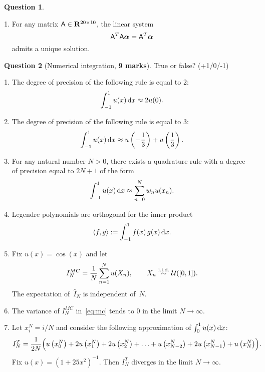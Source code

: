 \documentclass[11pt]{article}
\theoremstyle{definition}
\newtheorem{question}{{\normalfont \faGears}~Question}
\renewcommand{\mymarks}[1]{\textbf{#1 marks}}
\begin{document}
\begin{question}
\begin{enumerate}
        \item
            For any matrix $\mathsf A \in \mathbf R^{20 \times 10}$,
            the linear system
            \[
                \mathsf A^T \mathsf A \mathbf{\boldsymbol{\alpha}} = \mathsf A^T \mathbf{\boldsymbol{\alpha}}
            \]
            admits a unique solution.
    \end{enumerate}
\end{question}

\newpage
\begin{question}
    [Numerical integration, \mymarks{9}]
    True or false? (+1/0/-1)
    \begin{enumerate}
        \item
            The degree of precision of the following rule is equal to 2:
            \[
                \int_{-1}^{1} u(x) \, \mathrm d x \approx 2u(0).
            \]

        \item
            The degree of precision of the following rule is equal to 3:
            \[
                \int_{-1}^{1} u(x) \, \mathrm d x \approx u \left(-\frac{1}{3}\right) + u \left(\frac{1}{3}\right).
            \]

        \item
            For any natural number $N > 0$,
            there exists a quadrature rule with a degree of precision equal to $2N + 1$ of the form
            \[
                \int_{-1}^{1} u(x) \, \mathrm d x \approx
                \sum_{n=0}^{N} w_n u(x_n).
            \]

        \item
            Legendre polynomials are orthogonal for the inner product
            \[
                \langle f, g\rangle := \int_{-1}^{1} f(x) \, g(x) \,  \mathrm d x.
            \]

        \item
            Fix $u(x) = \cos(x)$ and let
            \begin{equation}
                \label{eq:mc}
                I^{MC}_N = \frac{1}{N} \sum_{n=1}^{N} u(X_n), \qquad X_n \stackrel{\rm i.i.d.}{\sim} \mathcal U([0, 1]).
            \end{equation}
            The expectation of~$\widehat I_N$ is independent of~$N$.

        \item
            The variance of $I^{MC}_N$ in~\eqref{eq:mc} tends to 0 in the limit $N \to \infty$.

        \item
            Let $x^N_i = i/N$ and consider the following approximation of $\int_{0}^{1} u(x) \, \mathrm d x$:
            \begin{equation}
                \label{eq:trapezium}
                I^T_N = \frac{1}{2N} \Bigl( u\left(x^N_0\right) + 2 u\left(x^N_1\right) + 2 u\left(x^N_2\right) + \dotsc + u\left(x^N_{N-2}\right) + 2 u\left(x^N_{N-1}\right) + u\left(x^N_N\right) \Bigr).
            \end{equation}
            Fix $u(x) = (1 + 25 x^2)^{-1}$.
            Then $I^T_N$ diverges in the limit $N \to \infty$.


\end{enumerate}
\end{question}
\end{document}
